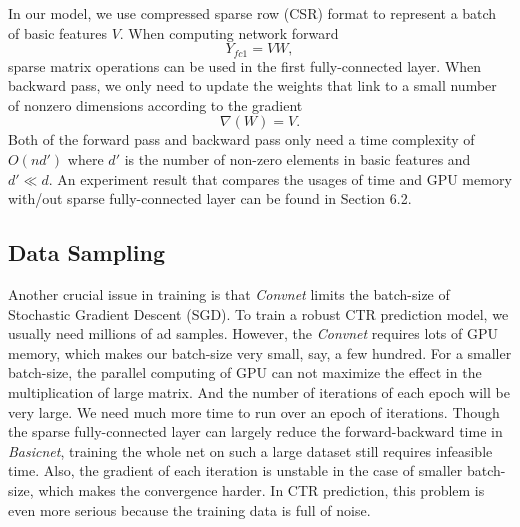 \documentclass{sig-alternate}
\begin{document}
In our model, we use compressed sparse row (CSR) format to represent a batch of basic features $V$. When computing network forward 
\begin{equation}
Y_{fc1} = VW,
\end{equation}
sparse matrix operations  can be used in the first fully-connected layer. When backward pass,  we only need to update the weights that link to a small number of nonzero dimensions according to the gradient
\begin{equation}
\nabla(W) = V.
\end{equation}
Both of the forward pass and backward pass only need a time complexity of $O(nd')$ where $d'$ is the number of  non-zero elements in basic features and $d' \ll d$. An experiment result that compares the usages of time and GPU memory with/out sparse fully-connected layer can be found in Section 6.2.
\subsection{Data Sampling}
Another crucial issue in  training is that \emph{Convnet} limits the batch-size of Stochastic Gradient Descent (SGD). To train a robust CTR prediction model, we usually need  millions of ad samples. However, the \emph{Convnet} requires lots of GPU memory, which makes our batch-size very small, say, a few hundred. For a smaller batch-size, the parallel computing of GPU can not maximize the effect in the multiplication of large matrix. And the number of iterations of each epoch will be very large. We need much more time to run over an epoch of iterations. Though the sparse fully-connected layer can largely reduce the forward-backward time in \emph{Basicnet}, training the whole net on such a large dataset still requires infeasible time. Also, the gradient of each iteration is unstable in the case of smaller batch-size, which makes the convergence harder. In CTR prediction, this problem is even more serious because the training data is full of noise.
\end{document}
